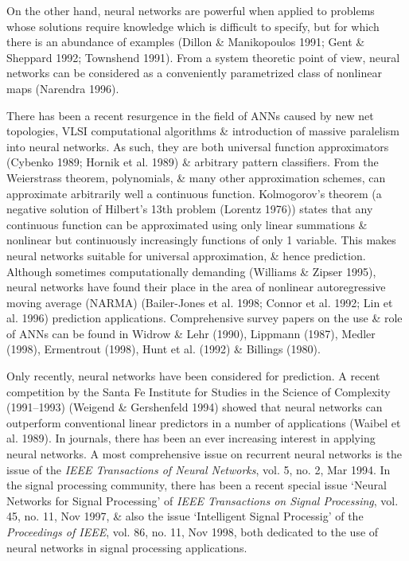 \documentclass{article}
\begin{document}
\begin{enumerate}
\begin{itemize}
\begin{itemize}
			On the other hand, neural networks are powerful when applied to problems whose solutions require knowledge which is difficult to specify, but for which there is an abundance of examples (Dillon \& Manikopoulos 1991; Gent \& Sheppard 1992; Townshend 1991). From a system theoretic point of view, neural networks can be considered as a conveniently parametrized class of nonlinear maps (Narendra 1996).
			
			There has been a recent resurgence in the field of ANNs caused by new net topologies, VLSI computational algorithms \& introduction of massive paralelism into neural networks. As such, they are both universal function approximators (Cybenko 1989; Hornik et al. 1989) \& arbitrary pattern classifiers. From the Weierstrass theorem, polynomials, \& many other approximation schemes, can approximate arbitrarily well a continuous function. Kolmogorov's theorem (a negative solution of Hilbert's 13th problem (Lorentz 1976)) states that any continuous function can be approximated using only linear summations \& nonlinear but continuously increasingly functions of only 1 variable. This makes neural networks suitable for universal approximation, \& hence prediction. Although sometimes computationally demanding (Williams \& Zipser 1995), neural networks have found their place in the area of nonlinear autoregressive moving average (NARMA) (Bailer-Jones et al. 1998; Connor et al. 1992; Lin et al. 1996) prediction applications. Comprehensive survey papers on the use \& role of ANNs can be found in Widrow \& Lehr (1990), Lippmann (1987), Medler (1998), Ermentrout (1998), Hunt et al. (1992) \& Billings (1980).
			
			Only recently, neural networks have been considered for prediction. A recent competition by the Santa Fe Institute for Studies in the Science of Complexity (1991--1993) (Weigend \& Gershenfeld 1994) showed that neural networks can outperform conventional linear predictors in a number of applications (Waibel et al. 1989). In journals, there has been an ever increasing interest in applying neural networks. A most comprehensive issue on recurrent neural networks is the issue of the {\it IEEE Transactions of Neural Networks}, vol. 5, no. 2, Mar 1994. In the signal processing community, there has been a recent special issue `Neural Networks for Signal Processing' of {\it IEEE Transactions on Signal Processing}, vol. 45, no. 11, Nov 1997, \& also the issue `Intelligent Signal Processig' of the {\it Proceedings of IEEE}, vol. 86, no. 11, Nov 1998, both dedicated to the use of neural networks in signal processing applications.
			

\end{itemize}
\end{itemize}
\end{enumerate}
\end{document}
